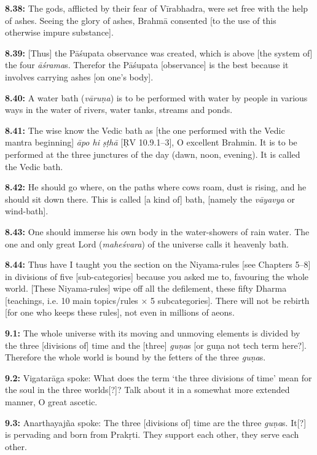 \documentclass{article}
\newcommand{\vsnum}[1]{\textbf{#1}}
\newcommand{\skt}[1]{\textit{#1}}
\begin{document}
\vsnum{8.38: }The gods, afflicted by their fear of Vīrabhadra, were set free with the help of ashes. Seeing the glory of ashes, Brahmā consented [to the use of this otherwise impure substance].

\vsnum{8.39: }[Thus] the Pāśupata observance was created, which is above [the system of] the four \skt{āśrama}s. Therefor the Pāśupata [observance] is the best because it involves carrying ashes [on one's body].

\vsnum{8.40: }A water bath (\skt{vāruṇa}) is to be performed with water by people in various ways in the water of rivers, water tanks, streams and ponds.

\vsnum{8.41: }The wise know the Vedic bath as [the one performed with the Vedic mantra beginning] \skt{āpo hi ṣṭhā} [ṚV 10.9.1--3], O excellent Brahmin. It is to be performed at the three junctures of the day (dawn, noon, evening). It is called the Vedic bath.

\vsnum{8.42: }He should go where, on the paths where cows roam, dust is rising, and he should sit down there. This is called [a kind of] bath, [namely the \skt{vāyavya} or wind-bath].

\vsnum{8.43: }One should immerse his own body in the water-showers of rain water. The one and only great Lord (\skt{maheśvara}) of the universe calls it heavenly bath.

\vsnum{8.44: }Thus have I taught you the section on the Niyama-rules [see Chapters 5--8] in divisions of five [sub-categories] because you asked me to, favouring the whole world. [These Niyama-rules] wipe off all the defilement, these fifty Dharma [teachings, i.e. 10 main topics/rules × 5 subcategories]. There will not be rebirth [for one who keeps these rules], not even in millions of aeons.


\vsnum{9.1: }The whole universe with its moving and unmoving elements is divided by the three [divisions of] time and the [three] \skt{guṇa}s [or guṇa not tech term here?]. Therefore the whole world is bound by the fetters of the three \skt{guṇa}s.

\vsnum{9.2: }Vigatarāga spoke: What does the term `the three divisions of time' mean for the soul in the three worlds[?]? Talk about it in a somewhat more extended manner, O great ascetic.

\vsnum{9.3: }Anarthayajña spoke: The three [divisions of] time are the three \skt{guṇa}s. It[?] is pervading and born from Prakṛti. They support each other, they serve each other.
\end{document}
